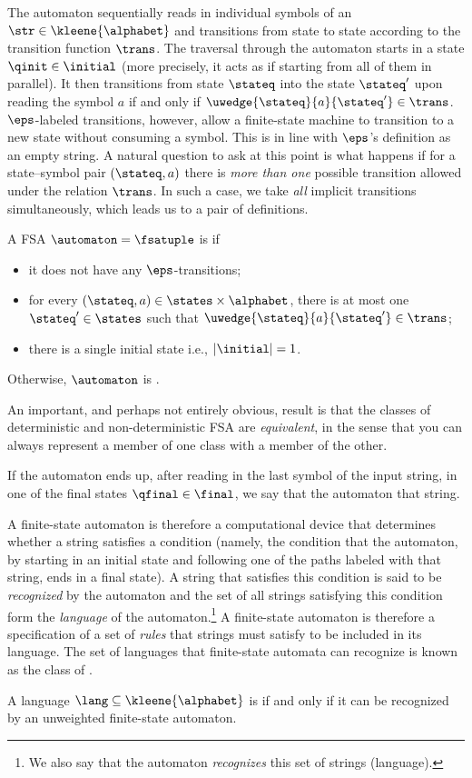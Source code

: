 The automaton sequentially reads in individual symbols of an  $\str \in \kleene{\alphabet}$ and transitions from state to state according to the transition function $\trans$.
The traversal through the automaton starts in a state $\qinit \in \initial$ (more precisely, it acts as if starting from all of them in parallel).
It then transitions from state $\stateq$ into the state $\stateq'$ upon reading the symbol $a$ if and only if $\uwedge{\stateq}{a}{\stateq'} \in \trans$.
$\eps$-labeled transitions, however, allow a finite-state machine to transition to a new state without consuming a symbol. 
This is in line with $\eps$'s definition as an empty string.
A natural question to ask at this point is what happens if for a state--symbol pair $(\stateq, a)$ there is \emph{more than one} possible transition allowed under the relation $\trans$. 
In such a case, we take \emph{all} implicit transitions simultaneously, which leads us to a pair of definitions.
\begin{definition}
A FSA $\automaton = \fsatuple$ is  if
\begin{itemize}
    \item it does not have any $\eps$-transitions;
    \item for every $(\stateq, a) \in \states \times \alphabet$, there is at most one $\stateq' \in \states$ such that $\uwedge{\stateq}{a}{\stateq'} \in \trans$;
    \item there is a single initial state i.e., $|\initial| = 1$.
\end{itemize} 
Otherwise, $\automaton$ is .
\end{definition}
An important, and perhaps not entirely obvious, result is that the classes of deterministic and non-deterministic FSA are \emph{equivalent}, in the sense that you can always represent a member of one class with a member of the other. 

If the automaton ends up, after reading in the last symbol of the input string, in one of the final states $\qfinal \in \final$, we say that the automaton  that string. 

A finite-state automaton is therefore a computational device that determines whether a string satisfies a condition (namely, the condition that the automaton, by starting in an initial state and following one of the paths labeled with that string, ends in a final state).
A string that satisfies this condition is said to be \emph{recognized} by the automaton and the set of all strings satisfying this condition form the \emph{language} of the automaton.\footnote{We also say that the automaton \emph{recognizes} this set of strings (language).} 
A finite-state automaton is therefore a specification of a set of \emph{rules} that strings must satisfy to be included in its language. 
The set of languages that finite-state automata can recognize is known as the class of .
\begin{definition}
A language $\lang\subseteq\kleene{\alphabet}$ is  if and only if it can be recognized by an unweighted finite-state automaton.
\end{definition}

